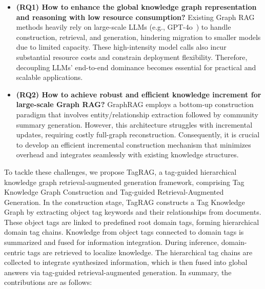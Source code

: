 \documentclass[11pt]{article}
\begin{document}



\begin{itemize}
    \item \textbf{(RQ1) How to enhance the global knowledge graph representation and reasoning with low resource consumption?} Existing Graph RAG methods heavily rely on large-scale LLMs (e.g., GPT-4o~\cite{hurst2024gpt}) to handle construction, retrieval, and generation, hindering migration to smaller models due to limited capacity. These high-intensity model calls also incur substantial resource costs and constrain deployment flexibility. Therefore, decoupling LLMs' end-to-end dominance becomes essential for practical and scalable applications.
    \item \textbf{(RQ2) How to achieve robust and efficient knowledge increment for large-scale Graph RAG?} GraphRAG employs a bottom-up construction paradigm that involves entity/relationship extraction followed by community summary generation. However, this architecture struggles with incremental updates, requiring costly full-graph reconstruction. Consequently, it is crucial to develop an efficient incremental construction mechanism that minimizes overhead and integrates seamlessly with existing knowledge structures.
\end{itemize}

To tackle these challenges, we propose TagRAG, a tag-guided hierarchical knowledge graph retrieval-augmented generation framework, comprising Tag Knowledge Graph Construction and Tag-guided Retrieval-Augmented Generation. 
In the construction stage, TagRAG constructs a Tag Knowledge Graph by extracting object tag keywords and their relationships from documents. These object tags are linked to predefined root domain tags, forming hierarchical domain tag chains. Knowledge from object tags connected to domain tags is summarized and fused for information integration.
During inference, domain-centric tags are retrieved to localize knowledge. The hierarchical tag chains are collected to integrate synthesized information, which is then fused into global answers via tag-guided retrieval-augmented generation.
In summary, the contributions are as follows:
\end{document}
